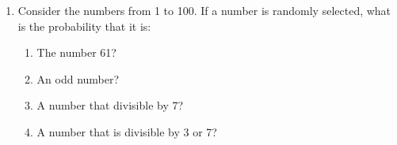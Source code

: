 \documentclass[letterpaper,12pt,fleqn]{article}
\begin{document}
\begin{enumerate}[left=0in,itemsep=0.5in]
\item Consider the numbers from 1 to 100.  If a number is randomly selected, what is the probability that it is:
  \begin{enumerate}
  \item The number 61?
  \item An odd number?
  \item A number that divisible by 7?
  \item A number that is divisible by 3 or 7?
  \end{enumerate}
\end{enumerate}
\end{document}
